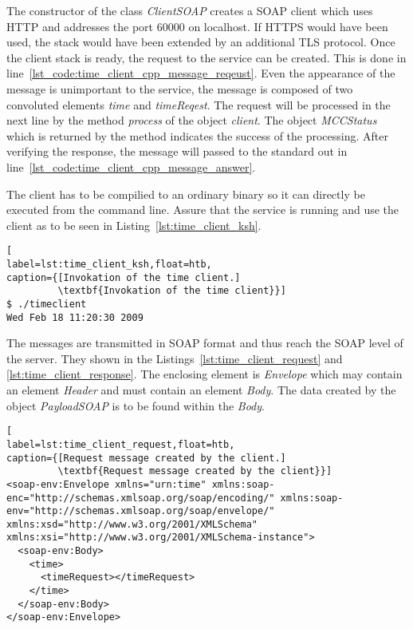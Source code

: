 The constructor of the class \textit{ClientSOAP} creates a SOAP client which uses HTTP and addresses the port 60000 on localhost.
If HTTPS would have been used, the stack would have been extended by an additional TLS protocol.
Once the client stack is ready, the request to the service can be created.
This is done in line~\ref{lst_code:time_client_cpp_message_reqeust}.
Even the appearance of the message is unimportant to the service, the message is composed of two convoluted elements \textit{time} and \textit{timeReqest}.
%
The request will be processed in the next line by the method \textit{process} of the object \textit{client}.%
The object \textit{MCCStatus} which is returned by the method indicates the success of the processing.
After verifying the response, the message will passed to the standard out in line~\ref{lst_code:time_client_cpp_message_answer}.


The client has to be compilied to an ordinary binary so it can directly be executed from the command line.
Assure that the service is running and use the client as to be seen in Listing~\ref{lst:time_client_ksh}.
\begin{lstlisting}[
label=lst:time_client_ksh,float=htb,
caption={[Invokation of the time client.]
         \textbf{Invokation of the time client}}]
$ ./timeclient
Wed Feb 18 11:20:30 2009
\end{lstlisting}
The messages are transmitted in SOAP format and thus reach the SOAP level of the server. They shown in the Listings~\ref{lst:time_client_request} and \ref{lst:time_client_response}.
The enclosing element is \textit{Envelope} which may contain an element \textit{Header} and must contain an element \textit{Body}. %
The data created by the object \textit{PayloadSOAP} is to be found within the \textit{Body}.
\begin{lstlisting}[
label=lst:time_client_request,float=htb,
caption={[Request message created by the client.]
         \textbf{Request message created by the client}}]
<soap-env:Envelope xmlns="urn:time" xmlns:soap-enc="http://schemas.xmlsoap.org/soap/encoding/" xmlns:soap-env="http://schemas.xmlsoap.org/soap/envelope/" xmlns:xsd="http://www.w3.org/2001/XMLSchema" xmlns:xsi="http://www.w3.org/2001/XMLSchema-instance">
  <soap-env:Body>
    <time>
      <timeRequest></timeRequest>
    </time>
  </soap-env:Body>
</soap-env:Envelope>
\end{lstlisting}


